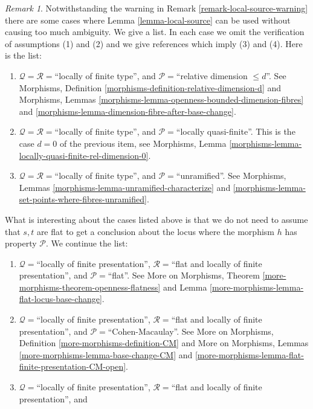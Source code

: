 \documentclass{stacks-project}
\theoremstyle{plain}
\theoremstyle{definition}
\theoremstyle{remark}
\newtheorem{remark}[subsection]{Remark}
\numberwithin{equation}{subsection}
\begin{document}
\begin{remark}
\label{remark-local-source-apply}
Notwithstanding the warning in
Remark \ref{remark-local-source-warning}
there are some cases where
Lemma \ref{lemma-local-source}
can be used without causing too much ambiguity.
We give a list. In each case we omit the verification of
assumptions (1) and (2) and we give references which imply
(3) and (4). Here is the list:
\begin{enumerate}
\item $\mathcal{Q} = \mathcal{R} =$``locally of finite type'', and
$\mathcal{P} =$``relative dimension $\leq d$''.
See
Morphisms, Definition \ref{morphisms-definition-relative-dimension-d}
and
Morphisms, Lemmas \ref{morphisms-lemma-openness-bounded-dimension-fibres} and
\ref{morphisms-lemma-dimension-fibre-after-base-change}.
\item $\mathcal{Q} = \mathcal{R} =$``locally of finite type'', and
$\mathcal{P} =$``locally quasi-finite''.
This is the case $d = 0$ of the previous item, see
Morphisms, Lemma \ref{morphisms-lemma-locally-quasi-finite-rel-dimension-0}.
\item $\mathcal{Q} = \mathcal{R} =$``locally of finite type'', and
$\mathcal{P} =$``unramified''.
See
Morphisms, Lemmas \ref{morphisms-lemma-unramified-characterize} and
\ref{morphisms-lemma-set-points-where-fibres-unramified}.
\end{enumerate}
What is interesting about the cases listed above is that we do not
need to assume that $s, t$ are flat to get a conclusion about the locus
where the morphism $h$ has property $\mathcal{P}$. We continue the
list:
\begin{enumerate}
\item[(4)] $\mathcal{Q} =$``locally of finite presentation'',
$\mathcal{R} =$``flat and locally of finite presentation'', and
$\mathcal{P} =$``flat''. See
More on Morphisms, Theorem
\ref{more-morphisms-theorem-openness-flatness} and
Lemma \ref{more-morphisms-lemma-flat-locus-base-change}.
\item[(5)] $\mathcal{Q} =$``locally of finite presentation'',
$\mathcal{R} =$``flat and locally of finite presentation'', and
$\mathcal{P}=$``Cohen-Macaulay''. See
More on Morphisms, Definition \ref{more-morphisms-definition-CM}
and
More on Morphisms, Lemmas \ref{more-morphisms-lemma-base-change-CM} and
\ref{more-morphisms-lemma-flat-finite-presentation-CM-open}.
\item[(6)] $\mathcal{Q} =$``locally of finite presentation'',
$\mathcal{R} =$``flat and locally of finite presentation'', and

\end{enumerate}
\end{remark}
\end{document}
